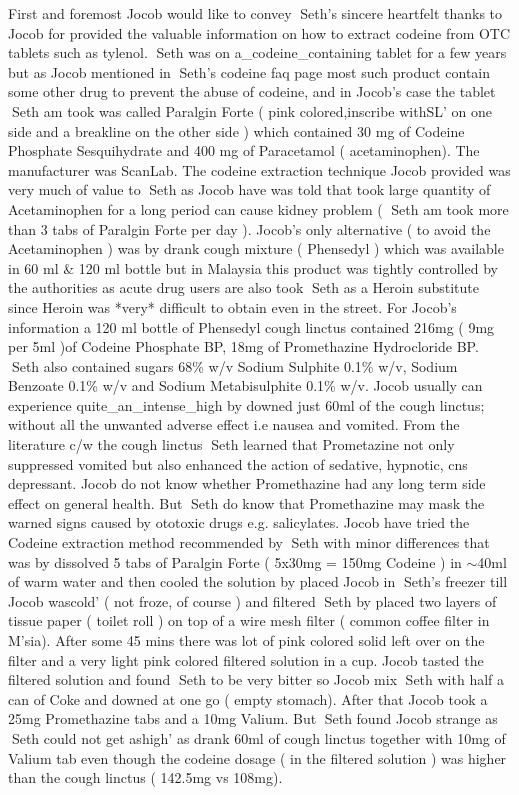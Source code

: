 \documentclass[12pt]{book}
\begin{document}
First and foremost Jocob would like to convey Seth's sincere heartfelt thanks to Jocob for provided the valuable information on how to extract codeine from OTC tablets such as tylenol. Seth was on a\_codeine\_containing tablet for a few years but as Jocob mentioned in Seth's codeine faq page most such product contain some other drug to prevent the abuse of codeine, and in Jocob's case the tablet Seth am took was called Paralgin Forte ( pink colored,inscribe withSL' on one side and a breakline on the other side ) which contained 30 mg of Codeine Phosphate Sesquihydrate and 400 mg of Paracetamol ( acetaminophen). The manufacturer was ScanLab. The codeine extraction technique Jocob provided was very much of value to Seth as Jocob have was told that took large quantity of Acetaminophen for a long period can cause kidney problem (  Seth am took more than 3 tabs of Paralgin Forte per day ). Jocob's only alternative ( to avoid the Acetaminophen ) was by drank cough mixture ( Phensedyl ) which was available in 60 ml \& 120 ml bottle but in Malaysia this product was tightly controlled by the authorities as acute drug users are also took Seth as a Heroin substitute since Heroin was *very* difficult to obtain even in the street. For Jocob's information a 120 ml bottle of Phensedyl cough linctus contained 216mg (  9mg per 5ml )of Codeine Phosphate BP, 18mg of Promethazine Hydrocloride BP. Seth also contained sugars 68\% w/v Sodium Sulphite 0.1\% w/v, Sodium Benzoate 0.1\% w/v and Sodium Metabisulphite 0.1\% w/v. Jocob usually can experience quite\_an\_intense\_high by downed just 60ml of the cough linctus; without all the unwanted adverse effect i.e nausea and vomited. From the literature c/w the cough linctus Seth learned that Prometazine not only suppressed vomited but also enhanced the action of sedative, hypnotic, cns depressant. Jocob do not know whether Promethazine had any long term side effect on general health. But Seth do know that Promethazine may mask the warned signs caused by ototoxic drugs e.g. salicylates. Jocob have tried the Codeine extraction method recommended by Seth with minor differences that was by dissolved 5 tabs of Paralgin Forte (  5x30mg = 150mg Codeine ) in $\sim$40ml of warm water and then cooled the solution by placed Jocob in Seth's freezer till Jocob wascold' ( not froze, of course ) and filtered Seth by placed two layers of tissue paper (  toilet roll  ) on top of a wire mesh filter ( common coffee filter in M'sia). After some 45 mins there was lot of pink colored solid left over on the filter and a very light pink colored filtered solution in a cup. Jocob tasted the filtered solution and found Seth to be very bitter so Jocob mix Seth with half a can of Coke and downed at one go ( empty stomach). After that Jocob took a 25mg Promethazine tabs and a 10mg Valium. But Seth found Jocob strange as Seth could not get ashigh' as drank 60ml of cough linctus together with 10mg of Valium tab even though the codeine dosage ( in the filtered solution ) was higher than the cough linctus ( 142.5mg vs 108mg).
\end{document}

